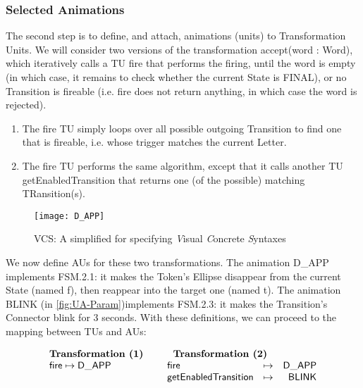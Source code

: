 \subsubsection{Selected Animations}
\label{sec:Proposal-FSM-ANIM}

The second step is to define, and attach, animations (units) to Transformation 
Units. We will consider two versions of the transformation \textsf{accept(word :
Word)}, which iteratively calls a TU \textsf{fire} that performs the firing, 
until the \textsf{word} is empty (in which case, it remains to check whether 
the current \textsf{State} is \textsf{FINAL}), or no \textsf{Transition} is 
fireable (i.e. \textsf{fire} does not return anything, in which case the 
\textsf{word} is rejected).
\begin{enumerate}
	\item The \textsf{fire} TU simply loops over all possible outgoing \textsf{Transition}
   to find one that is fireable, i.e. whose \textsf{trigger} matches the current \textsf{Letter}.
   
   \item The \textsf{fire} TU performs the same algorithm, except that it calls
   another TU \textsf{getEnabledTransition} that returns one (of the possible) matching
   \textsf{TRansition}(s).
\end{enumerate}

\begin{figure}[t]%
   \centering
   \texttt{[image: D\_APP]}%
   \caption{ \textsf{VCS}: A simplified \DSL for specifying \emph{V}isual \emph{C}oncrete \emph{S}yntaxes}%
   \label{fig:VCS}%
\end{figure}

We now define AUs for these two transformations. The animation \textsf{D\_APP}
implements \textsf{FSM.2.1}: it makes the \textsf{Token}'s \textsf{Ellipse} 
disappear from the current \textsf{State} (named \textsf{f}), then reappear 
into the target one (named \textsf{t}). 
The animation \textsf{BLINK} (in \autoref{fig:UA-Param})implements \textsf{FSM.2.3}:
it makes the \textsf{Transition}'s \textsf{Connector} blink for 3 seconds.
With these definitions, we can proceed to the mapping between TUs and AUs:

$$\begin{array}[t]{l}
   \textbf{Transformation (1)}\\
   \mathsf{fire} \mapsto \mathsf{D\_APP}
\end{array}
\hspace{0.5cm}
\begin{array}[t]{lcr}
   \multicolumn{2}{c}{\textbf{Transformation (2)}}\\
	\mathsf{fire} &\mapsto& \mathsf{D\_APP}\\
	\mathsf{getEnabledTransition} &\mapsto& \mathsf{BLINK}	
\end{array}$$

